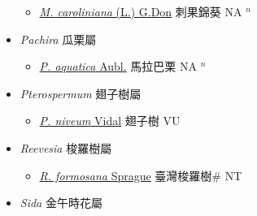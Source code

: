 \begin{itemize}
  \begin{itemize}
        \item[] \href{http://www.theplantlist.org/tpl1.1/search?q=Modiola+caroliniana}{\textit{M. caroliniana} (L.) G.Don}   刺果錦葵 NA $^n$
  \end{itemize}
 \item[] \textit{Pachira} 瓜栗屬
                    
  \begin{itemize}
        \item[] \href{http://www.theplantlist.org/tpl1.1/search?q=Pachira+aquatica}{\textit{P. aquatica} Aubl.}   馬拉巴栗 NA $^n$
  \end{itemize}
 \item[] \textit{Pterospermum} 翅子樹屬
                    
  \begin{itemize}
        \item[] \href{http://www.theplantlist.org/tpl1.1/search?q=Pterospermum+niveum}{\textit{P. niveum} Vidal}   翅子樹 VU
  \end{itemize}
 \item[] \textit{Reevesia} 梭羅樹屬
                    
  \begin{itemize}
        \item[] \href{http://www.theplantlist.org/tpl1.1/search?q=Reevesia+formosana}{\textit{R. formosana} Sprague}   臺灣梭羅樹\# NT
  \end{itemize}
 \item[] \textit{Sida} 金午時花屬
                    

\end{itemize}
